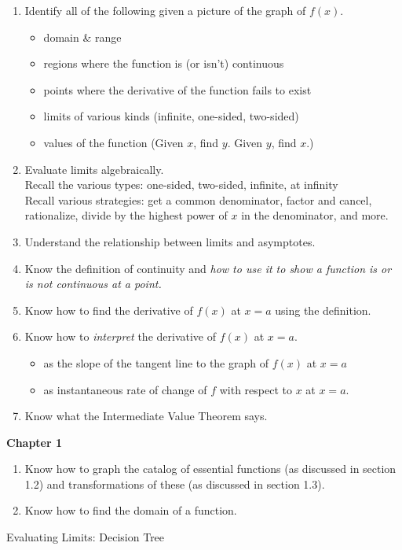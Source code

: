 \documentclass[12pt]{article}
\begin{document}
\begin{enumerate}
\item Identify all of the following given a picture of the graph of $f(x).$
	\begin{itemize}
	\item domain \& range
	\item regions where the function is (or isn't) continuous
	\item points where the derivative of the function fails to exist
	\item limits of various kinds (infinite, one-sided, two-sided)
	\item values of the function (Given $x$, find $y$. Given $y$, find $x$.)
	\end{itemize}
\item Evaluate limits algebraically. \\
Recall the various types: one-sided, two-sided, infinite, at infinity\\
Recall various strategies: get a common denominator, factor and cancel, rationalize, divide by the highest power of $x$ in the denominator, and more.\\

\item Understand the relationship between limits and asymptotes.
\item Know the definition of continuity and \emph{how to use it to show a function is or is not continuous at a point.}\\

\item Know how to find the derivative of $f(x)$ at $x=a$ using the definition.\\

\item Know how to \emph{interpret} the derivative of $f(x)$ at $x=a.$ 
	\begin{itemize}
	\item as the slope of the tangent line to the graph of $f(x)$ at $x=a$
	\item as instantaneous rate of change of $f$ with respect to $x$ at $x=a.$
	\end{itemize}
\item Know what the Intermediate Value Theorem says.
\end{enumerate}
\textbf{Chapter 1}
\begin{enumerate}
\item Know how to graph the catalog of essential functions (as discussed in section 1.2) and transformations of these (as discussed in section 1.3).\\

\item Know how to find the domain of a function.
\end{enumerate}
\newpage
\begin{center} Evaluating Limits: Decision Tree \end{center}
\end{document}
